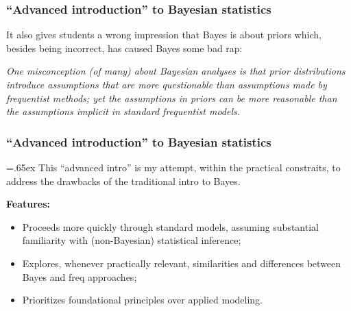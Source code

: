 \documentclass[18pt]{beamer}
\newenvironment{narrowItemize}[1][]{%
  \vspace{-.3\baselineskip}%
  \begin{itemize}[#1]
  \addtolength\itemsep{-.1\baselineskip}
}{
  \end{itemize}
}
\begin{document}
\begin{frame}
\frametitle{``Advanced introduction'' to Bayesian statistics}

It also gives students a wrong impression that Bayes is about priors which, besides being incorrect, has caused Bayes some bad rap:

\begin{center}
\begin{minipage}{.89\linewidth}
{\slshape
One misconception (of many) about Bayesian analyses is that prior distributions introduce assumptions that are more questionable than assumptions made by frequentist methods; yet the assumptions in priors can be more reasonable than the assumptions implicit in standard frequentist models.}

\vspace*{.3\baselineskip}
\hfill \citep{greenland2006bayes_for_epi}
\end{minipage}
\end{center}

\end{frame}


\begin{frame}
\frametitle{``Advanced introduction'' to Bayesian statistics}

{\font=.65ex 
This ``advanced intro'' is my attempt, within the practical constraits, 
}%
to address the drawbacks of the traditional intro to Bayes.

\pause
\textbf{Features:} 
\begin{narrowItemize}[<+->]
\item Proceeds more quickly through standard models, assuming substantial familiarity with (non-Bayesian) statistical inference;
\item Explores, whenever practically relevant, similarities and differences between Bayes and freq approaches;
\item Prioritizes foundational principles over applied modeling.
\end{narrowItemize}

\end{frame}
\end{document}
